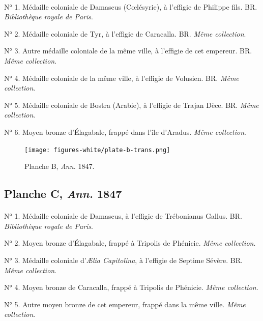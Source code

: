 \documentclass[a4paper, 11pt, oneside, polutonikogreek, french]{article}
\begin{document}
\paragraph{}
N° 1. Médaille coloniale de Damascus (Cœlésyrie), à l'effigie de Philippe fils. BR. \emph{Bibliothèque royale de Paris}.

N° 2. Médaille coloniale de Tyr, à l'effigie de Caracalla. BR. \emph{Même collection}.

N° 3. Autre médaille coloniale de la même ville, à l'effigie de cet empereur. BR. \emph{Même collection}.

N° 4. Médaille coloniale de la même ville, à l'effigie de Volusien. BR. \emph{Même collection}.

N° 5. Médaille coloniale de Bostra (Arabie), à l'effigie de Trajan Dèce. BR. \emph{Même collection}.

N° 6. Moyen bronze d'Élagabale, frappé dans l'île d'Aradus. \emph{Même collection}.
\vspace*{\fill}
\clearpage
\pagestyle{fancy}
\fancyhf{}
\cfoot{{\tiny\bfseries\thepage}}
\vspace*{\fill}
\begin{figure}[H]
\centering
\texttt{[image: figures-white/plate-b-trans.png]}
\caption{\scriptsize Planche B, \emph{Ann.} 1847.}
\end{figure}
\vspace*{\fill}
\clearpage
\pagestyle{plain}
\cfoot{{\tiny\bfseries\thepage}}
\vspace*{\fill}
\subsection{Planche C, \emph{Ann.} 1847}
\paragraph{}
N° 1. Médaille coloniale de Damascus, à l'effigie de Trébonianus Gallus. BR. \emph{Bibliothèque royale de Paris}.

N° 2. Moyen bronze d'Élagabale, frappé à Tripolis de Phénicie. \emph{Même collection}.

N° 3. Médaille coloniale d'\emph{Ælia Capitolina}, à l'effigie de Septime Sévère. BR. \emph{Même collection}.

N° 4. Moyen bronze de Caracalla, frappé à Tripolis de Phénicie. \emph{Même collection}.

N° 5. Autre moyen bronze de cet empereur, frappé dans la même ville. \emph{Même collection}.
\end{document}
